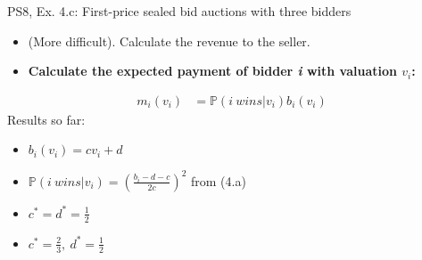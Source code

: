 \begin{frame}{PS8, Ex. 4.c: First-price sealed bid auctions with three bidders}
    \begin{itemize}
      \item[(c)] (More difficult). Calculate the revenue to the seller.
    \end{itemize}
    \vspace{-8pt}
    \begin{multicols}{2}
      \begin{itemize}
        \item[\nth{1} step:] \textbf{Calculate the expected payment of bidder \textit{i} with valuation $v_i$:}
      \end{itemize}
      \vspace{-14pt}
      \begin{align*}
        m_i(v_i)&=\mathbb{P}(i\ wins|v_i)b_i(v_i)
      \end{align*}
      \vfill\null\columnbreak
      Results so far:
      \vspace{-6pt}
      \begin{itemize}
        \item[($*$)] $b_i(v_i) = cv_i+d$
        \item[($\dagger$)] $\mathbb{P}(i\ wins|v_i)=\left(\frac{b_i-d-c}{2c}\right)^2$ from (4.a)
        \item[(3.a)] $c^*=d^*=\frac{1}{2}$
        \item[(4.a)] $c^*=\frac{2}{3},\ d^*=\frac{1}{2}$
      \end{itemize}
      \vfill\null
    \end{multicols}
    \vfill\null
\end{frame}
